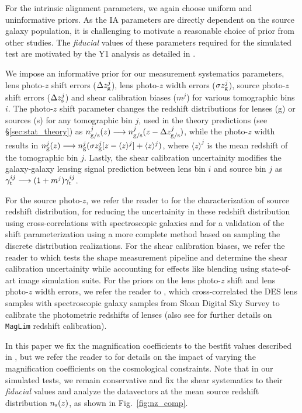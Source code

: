 \documentclass[aps, prd,twocolumn,superscriptaddress,nofootinbib,preprintnumbers]{revtex4-1}
\newcommand{\maglim}{\texttt{MagLim} }
\begin{document}
For the intrinsic alignment parameters, we again choose uniform and uninformative priors. As the IA parameters are directly dependent on the source galaxy population, it is challenging to motivate a reasonable choice of prior from other studies. The \textit{fiducial} values of these parameters required for the simulated test are motivated by the Y1 analysis as detailed in \cite{Samuroff_2019}.

We impose an informative prior for our measurement systematics parameters, lens photo-$z$ shift errors ($\Delta z^j_{\rm g}$), lens photo-$z$ width errors ($\sigma z^j_{\rm g}$), source photo-$z$ shift errors ($\Delta z^j_{\rm s}$) and shear calibration biases ($m^j$) for various tomographic bins $i$. The photo-$z$ shift parameter changes the redshift distributions for lenses (g) or sources (s) for any tomographic bin $j$, used in the theory predictions (see \S\ref{sec:stat_theory}) as $n^j_{\rm g/s}(z) \longrightarrow n^j_{\rm g/s}(z - \Delta z^j_{\rm g/s})$, while the photo-$z$ width results in  $n^j_{\rm g}(z) \longrightarrow n^j_{\rm g}(\sigma z^j_{\rm g}[z - \langle z \rangle^j] + \langle z \rangle^j)$, where $\langle z \rangle^j$ is the mean redshift of the tomographic bin $j$. Lastly, the shear calibration uncertainity modifies the galaxy-galaxy lensing signal prediction between lens bin $i$ and source bin $j$ as $\gamma^{ij}_{\rm t} \longrightarrow (1 + m^j)\gamma^{ij}_{\rm t}$. 


For the source photo-$z$, we refer the reader to \citet*{y3-sompz} for the characterization of source redshift distribution, \citet*{y3-sourcewz} for reducing the uncertainity in these redshift distribution using cross-correlations with spectroscopic galaxies and \citet*{y3-hyperrank} for a validation of the shift parameterization using a more complete method based on sampling the discrete distribution realizations. For the shear calibration biases, we refer the reader to \citet{y3-imagesims} which tests the shape measurement pipeline and determine the shear calibration uncertainity while accounting for effects like blending using state-of-art image simulation suite. For the priors on the lens photo-$z$ shift and lens photo-$z$ width errors, we refer the reader to \citet*{y3-lenswz}, which cross-correlated the DES lens samples with spectroscopic galaxy samples from Sloan Digital Sky Survey to calibrate the photometric redshifts of lenses (also see \citet{y3-2x2ptaltlenssompz} for further details on \maglim redshift calibration). 

In this paper we fix the magnification coefficients to the bestfit values described in \citet*{y3-2x2ptmagnification, y3-generalmethods}, but we refer the reader to \citet*{y3-2x2ptmagnification} for details on the impact of varying the magnification coefficients on the cosmological constraints. 
Note that in our simulated tests, we remain conservative and fix the shear systematics to their \textit{fiducial} values and analyze the datavectors at the mean source redshift distribution $n_{\rm s}(z)$, as shown in Fig.~\ref{fig:nz_comp}. 
\end{document}
